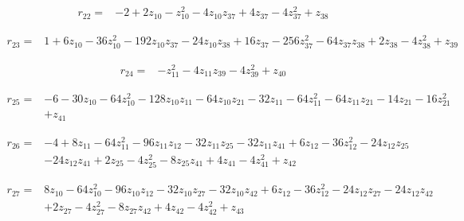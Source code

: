 \par\noindent\begin{minipage}{\linewidth}
\begin{align*}
r_{22}={}&-2+2z_{10}-z_{10}^{2}-4z_{10}z_{37}+4z_{37}-4z_{37}^{2}+z_{38}
\end{align*}
\end{minipage}\par
\par\noindent\begin{minipage}{\linewidth}
\begin{align*}
r_{23}={}&1+6z_{10}-36z_{10}^{2}-192z_{10}z_{37}-24z_{10}z_{38}+16z_{37}-256z_{37}^{2}-64z_{37}z_{38}+2z_{38}-4z_{38}^{2}+z_{39}
\end{align*}
\end{minipage}\par
\par\noindent\begin{minipage}{\linewidth}
\begin{align*}
r_{24}={}&-z_{11}^{2}-4z_{11}z_{39}-4z_{39}^{2}+z_{40}
\end{align*}
\end{minipage}\par
\par\noindent\begin{minipage}{\linewidth}
\begin{align*}
r_{25}={}&-6-30z_{10}-64z_{10}^{2}-128z_{10}z_{11}-64z_{10}z_{21}-32z_{11}-64z_{11}^{2}-64z_{11}z_{21}-14z_{21}-16z_{21}^{2}\\[-2pt]
&+z_{41}
\end{align*}
\end{minipage}\par
\par\noindent\begin{minipage}{\linewidth}
\begin{align*}
r_{26}={}&-4+8z_{11}-64z_{11}^{2}-96z_{11}z_{12}-32z_{11}z_{25}-32z_{11}z_{41}+6z_{12}-36z_{12}^{2}-24z_{12}z_{25}\\[-2pt]
&-24z_{12}z_{41}+2z_{25}-4z_{25}^{2}-8z_{25}z_{41}+4z_{41}-4z_{41}^{2}+z_{42}
\end{align*}
\end{minipage}\par
\par\noindent\begin{minipage}{\linewidth}
\begin{align*}
r_{27}={}&8z_{10}-64z_{10}^{2}-96z_{10}z_{12}-32z_{10}z_{27}-32z_{10}z_{42}+6z_{12}-36z_{12}^{2}-24z_{12}z_{27}-24z_{12}z_{42}\\[-2pt]
&+2z_{27}-4z_{27}^{2}-8z_{27}z_{42}+4z_{42}-4z_{42}^{2}+z_{43}
\end{align*}
\end{minipage}\par
